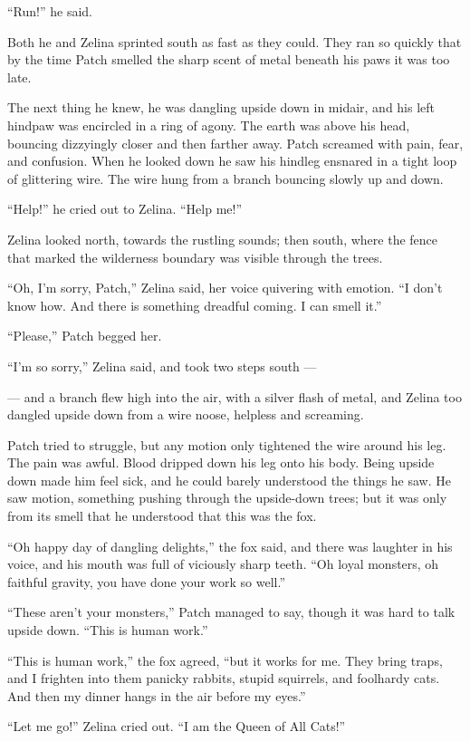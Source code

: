 \documentclass[12pt]{memoir}
\begin{document}
“Run!” he said.

Both he and Zelina sprinted south as fast as they could. They ran so
quickly that by the time Patch smelled the sharp scent of metal
beneath his paws it was too late.

The next thing he knew, he was dangling upside down in midair, and his
left hindpaw was encircled in a ring of agony. The earth was above his
head, bouncing dizzyingly closer and then farther away. Patch screamed
with pain, fear, and confusion. When he looked down he saw his hindleg
ensnared in a tight loop of glittering wire. The wire hung from a
branch bouncing slowly up and down.

“Help!” he cried out to Zelina. “Help me!”

Zelina looked north, towards the rustling sounds; then south, where
the fence that marked the wilderness boundary was visible through the
trees.

“Oh, I’m sorry, Patch,” Zelina said, her voice quivering with
emotion. “I don’t know how. And there is something dreadful coming. I
can smell it.”

“Please,” Patch begged her.

“I’m so sorry,” Zelina said, and took two steps south —

— and a branch flew high into the air, with a silver flash of metal,
and Zelina too dangled upside down from a wire noose, helpless and
screaming.

Patch tried to struggle, but any motion only tightened the wire around
his leg. The pain was awful. Blood dripped down his leg onto his
body. Being upside down made him feel sick, and he could barely
understood the things he saw. He saw motion, something pushing through
the upside-down trees; but it was only from its smell that he
understood that this was the fox.

“Oh happy day of dangling delights,” the fox said, and there was
laughter in his voice, and his mouth was full of viciously sharp
teeth. “Oh loyal monsters, oh faithful gravity, you have done your
work so well.”

“These aren’t your monsters,” Patch managed to say, though it was hard
to talk upside down. “This is human work.”

“This is human work,” the fox agreed, “but it works for me. They bring
traps, and I frighten into them panicky rabbits, stupid squirrels, and
foolhardy cats. And then my dinner hangs in the air before my eyes.”

“Let me go!” Zelina cried out. “I am the Queen of All Cats!”
\end{document}
